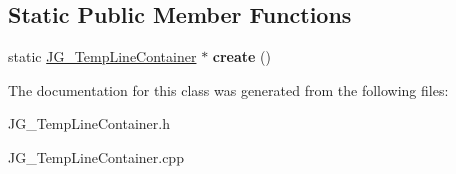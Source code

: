 \subsection*{Static Public Member Functions}
\begin{DoxyCompactItemize}
\item 
\hypertarget{class_j_g___temp_line_container_a0b2d8c7545456651abc6d5f60a690a14}{static \hyperlink{class_j_g___temp_line_container}{J\-G\-\_\-\-Temp\-Line\-Container} $\ast$ {\bfseries create} ()}\label{class_j_g___temp_line_container_a0b2d8c7545456651abc6d5f60a690a14}

\end{DoxyCompactItemize}


The documentation for this class was generated from the following files\-:\begin{DoxyCompactItemize}
\item 
J\-G\-\_\-\-Temp\-Line\-Container.\-h\item 
J\-G\-\_\-\-Temp\-Line\-Container.\-cpp\end{DoxyCompactItemize}

